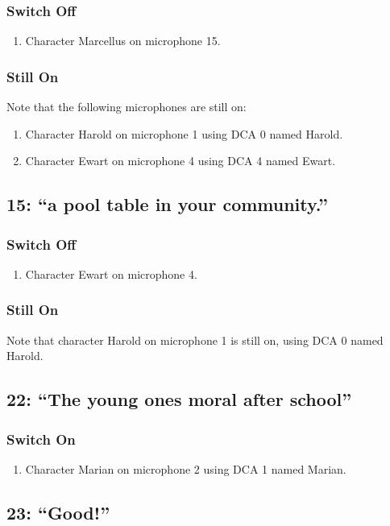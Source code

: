 \subsubsection* {Switch Off}
\begin{enumerate}
\item Character Marcellus on microphone 15.
\end{enumerate}
\subsubsection* {Still On}
Note that the following microphones are still on:
\begin{enumerate}
\item Character Harold on microphone 1 using DCA 0 named Harold.
\item Character Ewart on microphone 4 using DCA 4 named Ewart.
\end{enumerate}
\subsection* {15: ``a pool table in your community.''}
\subsubsection* {Switch Off}
\begin{enumerate}
\item Character Ewart on microphone 4.
\end{enumerate}
\subsubsection* {Still On}
Note that character Harold on microphone 1 is still on, using DCA 0 named Harold.\subsection* {22: ``The young ones moral after school''}
\subsubsection* {Switch On}
\begin{enumerate}
\item Character Marian on microphone 2 using DCA 1 named Marian.
\end{enumerate}
\subsection* {23: ``Good!''}
